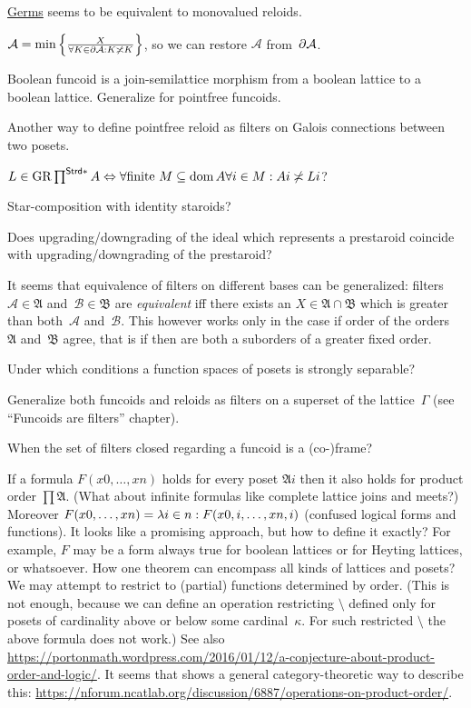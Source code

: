 \documentclass{amsart}
\begin{document}
\href{https://en.wikipedia.org/wiki/Germ (mathematics)}{Germs} seems to be equivalent to monovalued reloids.

$\mathcal{A} = \min\left\{ \frac{X}{\forall K\in\partial\mathcal{A}:K\not\asymp K}\right\}$, so we can restore $\mathcal{A}$ from~$\partial\mathcal{A}$.

Boolean funcoid is a join-semilattice morphism from a boolean lattice to a boolean lattice. Generalize for pointfree funcoids.

Another way to define pointfree reloid as filters on Galois connections between two posets.

$L \in \operatorname{GR} \prod^{\mathsf{Strd} \ast} A \Leftrightarrow \forall
\text{finite } M \subseteq \operatorname{dom} A \forall i \in M : A i \not\asymp L i$?

Star-composition with identity staroids?

Does upgrading/downgrading of the ideal which represents a prestaroid coincide with upgrading/downgrading of the prestaroid?

It seems that equivalence of filters on different bases can be generalized:
filters~$\mathcal{A}\in\mathfrak{A}$ and~$\mathcal{B}\in\mathfrak{B}$ are \emph{equivalent} iff
there exists an $X\in\mathfrak{A}\cap\mathfrak{B}$ which is greater than both~$\mathcal{A}$ and~$\mathcal{B}$.
This however works only in the case if order of the orders~$\mathfrak{A}$ and~$\mathfrak{B}$ agree,
that is if then are both a suborders of a greater fixed order.

Under which conditions a function spaces of posets is strongly separable?

Generalize both funcoids and reloids as filters on a superset of the lattice~$\Gamma$ (see ``Funcoids are filters'' chapter).

When the set of filters closed regarding a funcoid is a (co-)frame?

If a formula $F(x 0,\dots,x n)$ holds for every poset $\mathfrak{A} i$ then it also holds for product order $\prod\mathfrak{A}$.
(What about infinite formulas like complete lattice joins and meets?)
Moreover $F(x 0,\dots,x n) = \lambda i\in n:F(x {0,i},\dots,x {n,i})$ (confused logical forms and functions).
It looks like a promising approach, but how to define it exactly? For example, $F$ may be a form always true for boolean
lattices or for Heyting lattices, or whatsoever. How one theorem can encompass all kinds of lattices and posets?
We may attempt to restrict to (partial) functions determined by order.
(This is not enough, because we can define an operation restricting $\setminus$ defined only for posets
of cardinality above or below some cardinal~$\kappa$. For such restricted $\setminus$ the above formula does not work.)
See also \url{https://portonmath.wordpress.com/2016/01/12/a-conjecture-about-product-order-and-logic/}.
It seems that  shows a general category-theoretic way to describe this:
\url{https://nforum.ncatlab.org/discussion/6887/operations-on-product-order/}.
\end{document}
